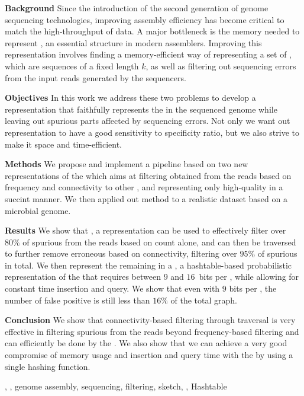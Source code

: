 \abstract

\textbf{Background} Since the introduction of the second generation of genome sequencing technologies, improving assembly efficiency has become critical to match the high-throughput of data. A major bottleneck is the memory needed to represent , an essential structure in modern assemblers. Improving this representation involves finding a memory-efficient way of representing a set of \kmers, which are sequences of a fixed length $k$, as well as filtering out sequencing errors from the input reads generated by the sequencers.

\textbf{Objectives} In this work we address these two problems to develop a \dBG representation that faithfully represents the \kmers in the sequenced genome while leaving out spurious parts affected by sequencing errors. Not only we want out representation to have a good sensitivity to specificity ratio, but we also strive to make it space and time-efficient.

\textbf{Methods} We propose and implement a pipeline based on two new representations of the \dBG which aims at filtering  obtained from the reads based on frequency and connectivity to other , and representing only high-quality  in a succint manner. We then applied out method to a realistic dataset based on a microbial genome.

\textbf{Results} We show that \dBCM, a  representation can be used to effectively filter over $80\%$ of spurious  from the reads based on count alone, and can then be traversed to further remove erroneous  based on connectivity, filtering over $95\%$ of spurious  in total. We then represent the remaining  in a \dBHT, a hashtable-based probabilistic representation of the \dBG that requires between $9$ and $16$~bits per \kmer, while allowing for constant time insertion and query. We show that even with $9$ bits per \kmer, the number of false positive  is still less than $16\%$ of the total graph.

\textbf{Conclusion} We show that connectivity-based filtering through traversal is very effective in filtering spurious  from the reads beyond frequency-based filtering and can efficiently be done by the \dBCM. We also show that we can achieve a very good compromise of memory usage and insertion and query time with the \dBHT by using a single hashing function.

\begin{keywords}
\dBG, \kmer, genome assembly, sequencing, filtering, sketch, \cm, Hashtable
\end{keywords}